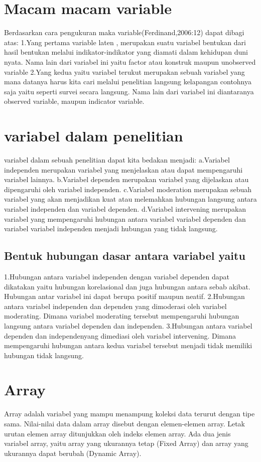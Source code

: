 \section{Macam macam variable}
Berdasarkan cara pengukuran maka variable(Ferdinand,2006:12) dapat dibagi atas:
1.Yang pertama variable laten , merupakan suatu variabel bentukan dari hasil bentukan melalui indikator-indikator yang diamati dalam 
kehidupan duni nyata. Nama lain dari variabel ini yaitu factor atau konstruk maupun unobserved variable
2.Yang kedua yaitu variabel terukut merupakan sebuah variabel yang mana datanya harus kita cari melalui penelitian langsung kelapangan 
contohnya saja yaitu seperti survei secara langsung. Nama lain dari variabel ini diantaranya observed variable, maupun indicator 
variable.

\section{variabel dalam penelitian}
variabel dalam sebuah penelitian dapat kita bedakan menjadi:
a.Variabel independen merupakan variabel yang menjelaskan atau dapat mempengaruhi variabel lainnya.
b.Variabel dependen merupakan variabel yang dijelaskan atau dipengaruhi oleh variabel independen.
c.Variabel moderation  merupakan sebuah variabel yang akan menjadikan kuat  atau melemahkan hubungan langsung antara variabel independen 
dan variabel dependen.
d.Variabel intervening merupakan variabel yang mempengaruhi hubungan antara variabel variabel dependen dan variabel variabel independen 
menjadi hubungan yang tidak langsung.

\subsection{Bentuk hubungan dasar antara variabel yaitu}
1.Hubungan antara variabel independen dengan variabel dependen dapat dikatakan yaitu hubungan korelasional dan juga hubungan antara 
sebab akibat. Hubungan antar variabel ini dapat berupa positif maupun neatif.
2.Hubungan antara variabel independen dan dependen yang dimoderasi oleh  variabel moderating. Dimana variabel moderating tersebut 
mempengaruhi hubungan langsung antara variabel dependen dan independen.
3.Hubungan antara variabel dependen dan independenyang dimediasi oleh variabel intervening. Dimana mempengaruhi hubungan antara kedua 
variabel tersebut menjadi tidak memiliki hubungan tidak langsung.

\section{Array}
Array adalah variabel yang mampu menampung koleksi data terurut dengan tipe sama. 
Nilai-nilai data dalam array disebut dengan elemen-elemen array. Letak urutan elemen array ditunjukkan oleh indeks elemen array. 
Ada dua jenis variabel array, yaitu array yang ukurannya tetap (Fixed Array) dan array yang ukurannya dapat berubah (Dynamic Array).

